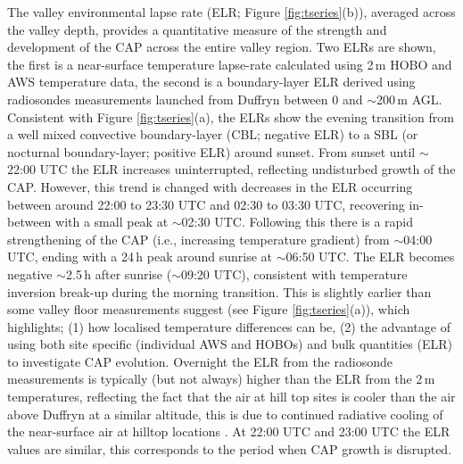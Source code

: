 \documentclass[times]{qjrms4}
\begin{document}
The valley environmental lapse rate (ELR; Figure \ref{fig:tseries}(b)), averaged across the valley depth, provides a quantitative measure of the strength and development of the CAP across the entire valley region. Two ELRs are shown, the first is a near-surface temperature lapse-rate calculated using 2$\,\mbox{m}$ HOBO and AWS temperature data, the second is a boundary-layer ELR derived using radiosondes measurements launched from Duffryn between 0 and $\sim$200$\,\mbox{m}$ AGL. Consistent with Figure \ref{fig:tseries}(a), the ELRs show the evening transition from a well mixed convective boundary-layer (CBL; negative ELR) to a SBL (or nocturnal boundary-layer; positive ELR) around sunset. From sunset until $\sim$22:00 UTC the ELR increases uninterrupted, reflecting undisturbed growth of the CAP. However, this trend is changed with decreases in the ELR occurring between around 22:00 to 23:30 UTC and 02:30 to 03:30 UTC, recovering in-between with a small peak at $\sim$02:30 UTC. Following this there is a rapid strengthening of the CAP (i.e., increasing temperature gradient) from $\sim$04:00 UTC, ending with a 24$\,\mbox{h}$ peak around sunrise at $\sim$06:50 UTC. The ELR becomes negative $\sim$2.5$\,\mbox{h}$ after sunrise ($\sim$09:20 UTC), consistent with temperature inversion break-up during the morning transition. This is slightly earlier than some valley floor measurements suggest (see Figure \ref{fig:tseries}(a)), which highlights; (1) how localised temperature differences can be, (2) the advantage of using both site specific (individual AWS and HOBOs) and bulk quantities (ELR) to investigate CAP evolution. Overnight the ELR from the radiosonde measurements is typically (but not always) higher than the ELR from the 2$\,\mbox{m}$ temperatures, reflecting the fact that the air at hill top sites is cooler than the air above Duffryn at a similar altitude, this is due to continued radiative cooling of the near-surface air at hilltop locations \citep{Vosper2013narrow}. At 22:00 UTC and 23:00 UTC the ELR values are similar, this corresponds to the period when CAP growth is disrupted.
\end{document}

